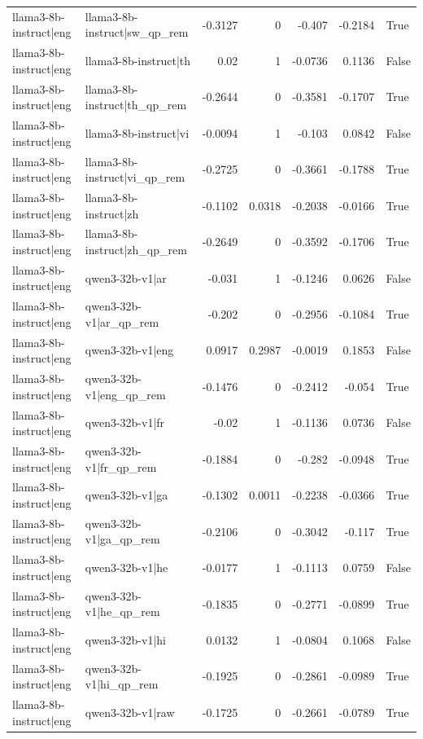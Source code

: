 \begin{table}
\begin{tabular}{l l r r r r l}
llama3-8b-instruct|eng & llama3-8b-instruct|sw_qp_rem & -0.3127 & 0 & -0.407 & -0.2184 & True \\
llama3-8b-instruct|eng & llama3-8b-instruct|th & 0.02 & 1 & -0.0736 & 0.1136 & False \\
llama3-8b-instruct|eng & llama3-8b-instruct|th_qp_rem & -0.2644 & 0 & -0.3581 & -0.1707 & True \\
llama3-8b-instruct|eng & llama3-8b-instruct|vi & -0.0094 & 1 & -0.103 & 0.0842 & False \\
llama3-8b-instruct|eng & llama3-8b-instruct|vi_qp_rem & -0.2725 & 0 & -0.3661 & -0.1788 & True \\
llama3-8b-instruct|eng & llama3-8b-instruct|zh & -0.1102 & 0.0318 & -0.2038 & -0.0166 & True \\
llama3-8b-instruct|eng & llama3-8b-instruct|zh_qp_rem & -0.2649 & 0 & -0.3592 & -0.1706 & True \\
llama3-8b-instruct|eng & qwen3-32b-v1|ar & -0.031 & 1 & -0.1246 & 0.0626 & False \\
llama3-8b-instruct|eng & qwen3-32b-v1|ar_qp_rem & -0.202 & 0 & -0.2956 & -0.1084 & True \\
llama3-8b-instruct|eng & qwen3-32b-v1|eng & 0.0917 & 0.2987 & -0.0019 & 0.1853 & False \\
llama3-8b-instruct|eng & qwen3-32b-v1|eng_qp_rem & -0.1476 & 0 & -0.2412 & -0.054 & True \\
llama3-8b-instruct|eng & qwen3-32b-v1|fr & -0.02 & 1 & -0.1136 & 0.0736 & False \\
llama3-8b-instruct|eng & qwen3-32b-v1|fr_qp_rem & -0.1884 & 0 & -0.282 & -0.0948 & True \\
llama3-8b-instruct|eng & qwen3-32b-v1|ga & -0.1302 & 0.0011 & -0.2238 & -0.0366 & True \\
llama3-8b-instruct|eng & qwen3-32b-v1|ga_qp_rem & -0.2106 & 0 & -0.3042 & -0.117 & True \\
llama3-8b-instruct|eng & qwen3-32b-v1|he & -0.0177 & 1 & -0.1113 & 0.0759 & False \\
llama3-8b-instruct|eng & qwen3-32b-v1|he_qp_rem & -0.1835 & 0 & -0.2771 & -0.0899 & True \\
llama3-8b-instruct|eng & qwen3-32b-v1|hi & 0.0132 & 1 & -0.0804 & 0.1068 & False \\
llama3-8b-instruct|eng & qwen3-32b-v1|hi_qp_rem & -0.1925 & 0 & -0.2861 & -0.0989 & True \\
llama3-8b-instruct|eng & qwen3-32b-v1|raw & -0.1725 & 0 & -0.2661 & -0.0789 & True \\

\end{tabular}
\end{table}
